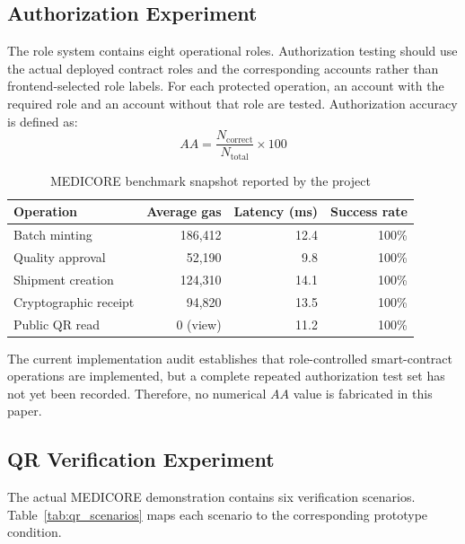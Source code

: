 \documentclass[11pt,a4paper]{article}
\begin{document}
\subsection{Authorization Experiment}
The role system contains eight operational roles. Authorization testing should use the actual deployed contract roles and the corresponding accounts rather than frontend-selected role labels. For each protected operation, an account with the required role and an account without that role are tested. Authorization accuracy is defined as:
\begin{equation}
AA = \frac{N_{\text{correct}}}{N_{\text{total}}} \times 100
\end{equation}

\begin{table}[htbp]
\centering
\caption{MEDICORE benchmark snapshot reported by the project}
\label{tab:benchmarks_snapshot}
\vspace{0.5em}
\begin{tabular}{lrrr}
\toprule
\textbf{Operation} & \textbf{Average gas} & \textbf{Latency (ms)} & \textbf{Success rate} \\
\midrule
Batch minting & 186,412 & 12.4 & 100\% \\
Quality approval & 52,190 & 9.8 & 100\% \\
Shipment creation & 124,310 & 14.1 & 100\% \\
Cryptographic receipt & 94,820 & 13.5 & 100\% \\
Public QR read & 0 (view) & 11.2 & 100\% \\
\bottomrule
\end{tabular}
\end{table}

The current implementation audit establishes that role-controlled smart-contract operations are implemented, but a complete repeated authorization test set has not yet been recorded. Therefore, no numerical $AA$ value is fabricated in this paper.

\subsection{QR Verification Experiment}
The actual MEDICORE demonstration contains six verification scenarios. Table~\ref{tab:qr_scenarios} maps each scenario to the corresponding prototype condition.
\end{document}
